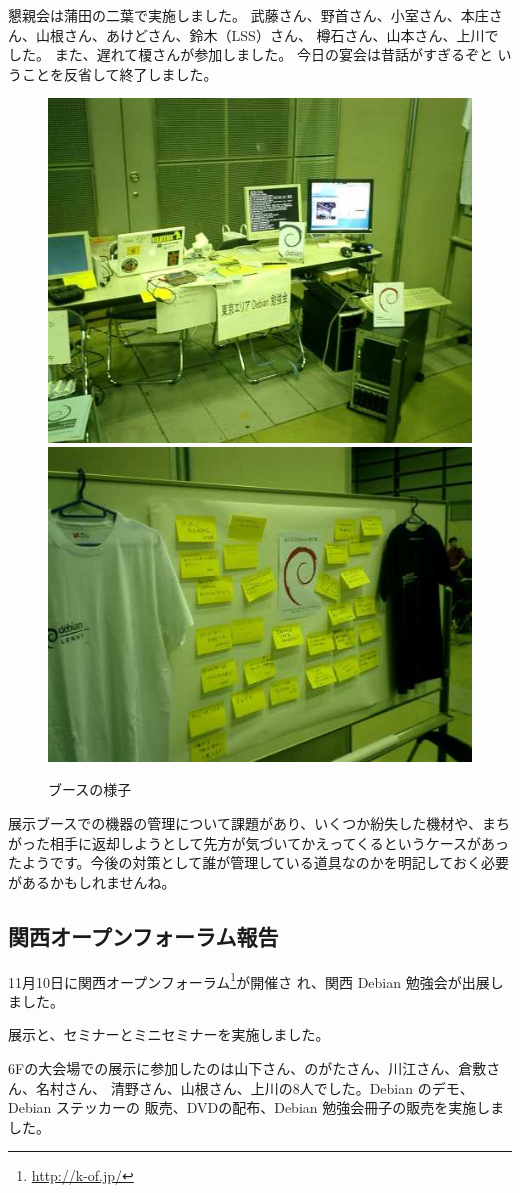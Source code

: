 \documentclass[mingoth,a4paper]{jsarticle}
\begin{document}
懇親会は蒲田の二葉で実施しました。 武藤さん、野首さん、小室さん、本庄さ
ん、山根さん、あけどさん、鈴木（LSS）さん、 樽石さん、山本さん、上川で
した。 また、遅れて榎さんが参加しました。 今日の宴会は昔話がすぎるぞと
いうことを反省して終了しました。

 \begin{figure}[H]
 \begin{center}
  \includegraphics[width=0.4\hsize]{image200710/booth.jpg}
  \includegraphics[width=0.4\hsize]{image200710/whiteboard.jpg}
 \end{center}
 \caption{ブースの様子}
 \label{fig:oscfalldebbooth2}
 \end{figure}

展示ブースでの機器の管理について課題があり、いくつか紛失した機材や、まち
がった相手に返却しようとして先方が気づいてかえってくるというケースがあっ
たようです。今後の対策として誰が管理している道具なのかを明記しておく必要
があるかもしれませんね。


\subsection{関西オープンフォーラム報告}

11月10日に関西オープンフォーラム\footnote{\url{http://k-of.jp/}}が開催さ
れ、関西 Debian 勉強会が出展しました。

展示と、セミナーとミニセミナーを実施しました。

6Fの大会場での展示に参加したのは山下さん、のがたさん、川江さん、倉敷さん、名村さん、
清野さん、山根さん、上川の8人でした。Debian のデモ、Debian ステッカーの
販売、DVDの配布、Debian 勉強会冊子の販売を実施しました。
\end{document}
